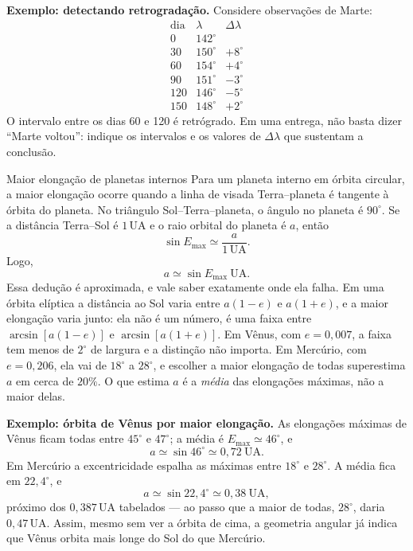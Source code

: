 \documentclass[11pt,a4paper]{article}
\begin{document}
\textbf{Exemplo: detectando retrogradação.} Considere observações de Marte:
\[
\begin{array}{c|c|c}
\text{dia} & \lambda & \Delta\lambda\\
\hline
0 & 142^\circ & \\
30 & 150^\circ & +8^\circ\\
60 & 154^\circ & +4^\circ\\
90 & 151^\circ & -3^\circ\\
120 & 146^\circ & -5^\circ\\
150 & 148^\circ & +2^\circ
\end{array}
\]
O intervalo entre os dias 60 e 120 é retrógrado. Em uma entrega, não basta dizer ``Marte voltou'': indique os intervalos e os valores de $\Delta\lambda$ que sustentam a conclusão.

\begin{lessonblock}[borderline west={2pt}{0pt}{astroGold}]{Maior elongação de planetas internos}
Para um planeta interno em órbita circular, a maior elongação ocorre quando a linha de visada Terra--planeta é tangente à órbita do planeta. No triângulo Sol--Terra--planeta, o ângulo no planeta é $90^\circ$. Se a distância Terra--Sol é $1\,\mathrm{UA}$ e o raio orbital do planeta é $a$, então
\[
\sin E_{\max}\simeq \frac{a}{1\,\mathrm{UA}}.
\]
Logo,
\[
a\simeq \sin E_{\max}\ \mathrm{UA}.
\]
Essa dedução é aproximada, e vale saber exatamente onde ela falha. Em uma órbita elíptica a distância ao Sol
varia entre $a(1-e)$ e $a(1+e)$, e a maior elongação varia junto: ela não é um número, é uma faixa entre
$\arcsin[a(1-e)]$ e $\arcsin[a(1+e)]$. Em Vênus, com $e=0{,}007$, a faixa tem menos de $2^\circ$ de largura e a
distinção não importa. Em Mercúrio, com $e=0{,}206$, ela vai de $18^\circ$ a $28^\circ$, e escolher a maior
elongação de todas superestima $a$ em cerca de $20\%$. O que estima $a$ é a \emph{média} das elongações
máximas, não a maior delas.
\end{lessonblock}

\textbf{Exemplo: órbita de Vênus por maior elongação.} As elongações máximas de Vênus ficam todas entre
$45^\circ$ e $47^\circ$; a média é $E_{\max}\simeq46^\circ$, e
\[
a\simeq\sin 46^\circ\simeq0{,}72\ \mathrm{UA}.
\]
Em Mercúrio a excentricidade espalha as máximas entre $18^\circ$ e $28^\circ$. A média fica em
$22{,}4^\circ$, e
\[
a\simeq\sin 22{,}4^\circ\simeq0{,}38\ \mathrm{UA},
\]
próximo dos $0{,}387\,\mathrm{UA}$ tabelados --- ao passo que a maior de todas, $28^\circ$, daria
$0{,}47\,\mathrm{UA}$.
Assim, mesmo sem ver a órbita de cima, a geometria angular já indica que Vênus orbita mais longe do Sol do que Mercúrio.
\end{document}
